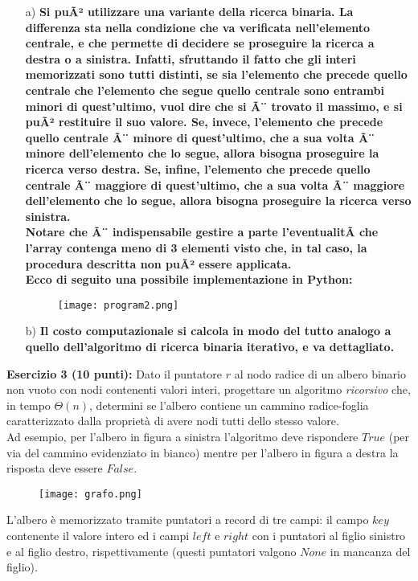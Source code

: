 \documentclass[12pt]{article}
\begin{document}
\begin{itemize}
\item[a)]  
\textbf{Si puÃ² utilizzare una variante della ricerca binaria. La differenza sta nella condizione che va verificata nell'elemento centrale, e che permette di decidere se proseguire la ricerca a destra o a sinistra.
Infatti, sfruttando il fatto che gli interi memorizzati sono tutti distinti, se sia l'elemento che precede quello centrale che l'elemento che segue quello centrale sono entrambi minori di quest'ultimo, vuol dire che si Ã¨ trovato il massimo, e si puÃ² restituire il suo valore.
Se, invece, l'elemento che precede quello centrale Ã¨ minore di quest'ultimo, che a sua volta Ã¨ minore dell'elemento che lo segue, allora bisogna proseguire la ricerca verso destra.
Se, infine,  l'elemento che precede quello centrale Ã¨ maggiore di quest'ultimo, che a sua volta Ã¨ maggiore dell'elemento che lo segue, allora bisogna proseguire la ricerca verso sinistra.\\
Notare che Ã¨ indispensabile gestire a parte l'eventualitÃ  che l'array contenga meno di 3 elementi visto che, in tal caso, la procedura descritta non puÃ² essere applicata.
\\
Ecco di seguito una possibile implementazione in Python:}
\begin{figure}[h!]
\center
\texttt{[image: program2.png]}
\end{figure}


\item[b)]  
\textbf{Il costo computazionale si calcola in modo del tutto analogo a quello dell'algoritmo di ricerca binaria iterativo, e va dettagliato.
}
\end{itemize}
\medskip \medskip


\medskip

\noindent
{\bf Esercizio 3 (10 punti):}
\noindent Dato il puntatore $r$ al nodo radice di un albero binario non vuoto con nodi contenenti valori interi, progettare un algoritmo {\em ricorsivo} che, in tempo $\Theta(n)$, determini se l'albero contiene un cammino radice-foglia caratterizzato dalla propriet\`a di avere nodi tutti dello stesso valore. \\
Ad esempio, per l'albero in figura a sinistra  l'algoritmo deve rispondere  $True$ (per via del cammino evidenziato in bianco) mentre per l'albero in figura a destra  la risposta deve essere  $False$.\\

\medskip
\begin{figure}[h!]
\center
\texttt{[image: grafo.png]}
\end{figure}
\noindent L'albero \`e memorizzato tramite puntatori a record di tre campi: il campo $key$
contenente  il valore  intero ed i campi $left$ e $right$ con i puntatori al figlio 
sinistro e al  figlio destro, rispettivamente (questi puntatori valgono $None$ in mancanza del figlio).
\end{document}
